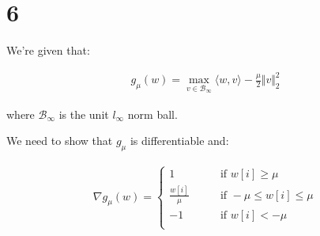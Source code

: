 \documentclass{article}
\begin{document}





\section*{6}

We're given that:

\begin{align*}
    g_\mu(w) = \max_{v \in \mathcal{B}_\infty}\langle w, v \rangle - \frac{\mu}{2} \Vert v \Vert^2_2
\end{align*}

where $\mathcal{B}_\infty$ is the unit $l_\infty$ norm ball.
\bigskip

We need to show that $g_\mu$ is differentiable and:

\begin{align*}
    \nabla g_\mu(w) = 
    \begin{cases}
        1 \qquad &\text{if } w[i] \geq \mu \\
        \frac{w[i]}{\mu} \qquad &\text{if } - \mu \leq w[i] \leq \mu \\
        -1 \qquad &\text{if } w[i] < - \mu \\
    \end{cases}
\end{align*}
\end{document}
